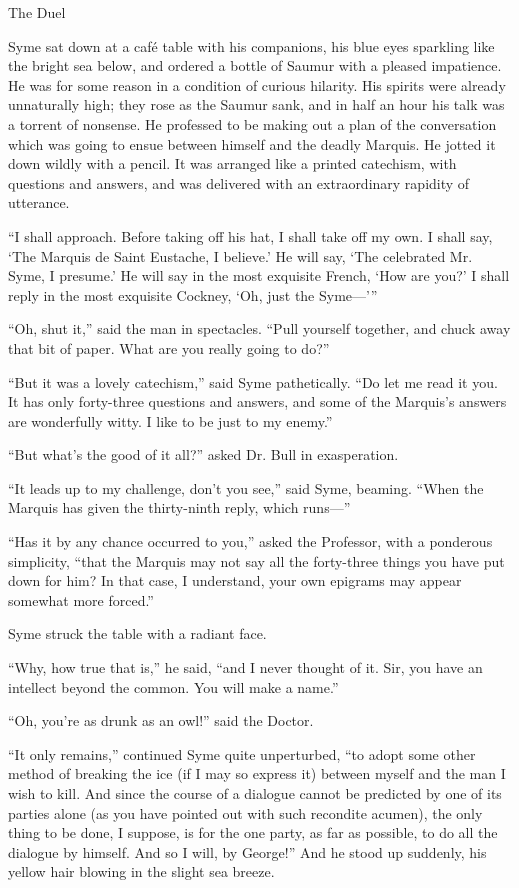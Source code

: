 \chap The Duel

Syme sat down at a café table with his companions, his blue eyes sparkling like the bright sea below, and ordered a bottle of Saumur with a pleased impatience. He was for some reason in a condition of curious hilarity. His spirits were already unnaturally high; they rose as the Saumur sank, and in half an hour his talk was a torrent of nonsense. He professed to be making out a plan of the conversation which was going to ensue between himself and the deadly Marquis. He jotted it down wildly with a pencil. It was arranged like a printed catechism, with questions and answers, and was delivered with an extraordinary rapidity of utterance.

“I shall approach. Before taking off his hat, I shall take off my own. I shall say, ‘The Marquis de Saint Eustache, I believe.’ He will say, ‘The celebrated Mr. Syme, I presume.’ He will say in the most exquisite French, ‘How are you?’ I shall reply in the most exquisite Cockney, ‘Oh, just the Syme⁠—’ ”

“Oh, shut it,” said the man in spectacles. “Pull yourself together, and chuck away that bit of paper. What are you really going to do?”

“But it was a lovely catechism,” said Syme pathetically. “Do let me read it you. It has only forty-three questions and answers, and some of the Marquis’s answers are wonderfully witty. I like to be just to my enemy.”

“But what’s the good of it all?” asked Dr. Bull in exasperation.

“It leads up to my challenge, don’t you see,” said Syme, beaming. “When the Marquis has given the thirty-ninth reply, which runs⁠—”

“Has it by any chance occurred to you,” asked the Professor, with a ponderous simplicity, “that the Marquis may not say all the forty-three things you have put down for him? In that case, I understand, your own epigrams may appear somewhat more forced.”

Syme struck the table with a radiant face.

“Why, how true that is,” he said, “and I never thought of it. Sir, you have an intellect beyond the common. You will make a name.”

“Oh, you’re as drunk as an owl!” said the Doctor.

“It only remains,” continued Syme quite unperturbed, “to adopt some other method of breaking the ice (if I may so express it) between myself and the man I wish to kill. And since the course of a dialogue cannot be predicted by one of its parties alone (as you have pointed out with such recondite acumen), the only thing to be done, I suppose, is for the one party, as far as possible, to do all the dialogue by himself. And so I will, by George!” And he stood up suddenly, his yellow hair blowing in the slight sea breeze.

